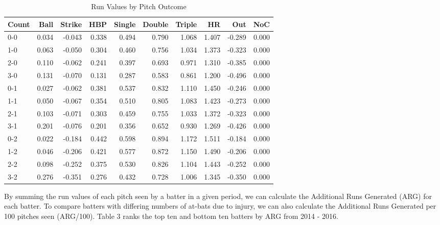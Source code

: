 \documentclass[11pt]{article}
\begin{document}
\begin{table}[ht]
\centering
\begin{tabular}{lrrrrrrrrr}
  \hline
Count & Ball & Strike & HBP & Single & Double & Triple & HR & Out & NoC \\ 
  \hline
0-0 & 0.034 & -0.043 & 0.338 & 0.494 & 0.790 & 1.068 & 1.407 & -0.289 & 0.000 \\ 
  1-0 & 0.063 & -0.050 & 0.304 & 0.460 & 0.756 & 1.034 & 1.373 & -0.323 & 0.000 \\ 
  2-0 & 0.110 & -0.062 & 0.241 & 0.397 & 0.693 & 0.971 & 1.310 & -0.385 & 0.000 \\ 
  3-0 & 0.131 & -0.070 & 0.131 & 0.287 & 0.583 & 0.861 & 1.200 & -0.496 & 0.000 \\ 
  0-1 & 0.027 & -0.062 & 0.381 & 0.537 & 0.832 & 1.110 & 1.450 & -0.246 & 0.000 \\ 
  1-1 & 0.050 & -0.067 & 0.354 & 0.510 & 0.805 & 1.083 & 1.423 & -0.273 & 0.000 \\ 
  2-1 & 0.103 & -0.071 & 0.303 & 0.459 & 0.755 & 1.033 & 1.372 & -0.323 & 0.000 \\ 
  3-1 & 0.201 & -0.076 & 0.201 & 0.356 & 0.652 & 0.930 & 1.269 & -0.426 & 0.000 \\ 
  0-2 & 0.022 & -0.184 & 0.442 & 0.598 & 0.894 & 1.172 & 1.511 & -0.184 & 0.000 \\ 
  1-2 & 0.046 & -0.206 & 0.421 & 0.577 & 0.872 & 1.150 & 1.490 & -0.206 & 0.000 \\ 
  2-2 & 0.098 & -0.252 & 0.375 & 0.530 & 0.826 & 1.104 & 1.443 & -0.252 & 0.000 \\ 
  3-2 & 0.276 & -0.351 & 0.276 & 0.432 & 0.728 & 1.006 & 1.345 & -0.350 & 0.000 \\ 
   \hline
\end{tabular}
\caption{Run Values by Pitch Outcome}
\end{table}

By summing the run values of each pitch seen by a batter in a given period, we can calculate the Additional Runs Generated (ARG) for each batter.  To compare batters with differing numbers of at-bats due to injury, we can also calculate the Additional Runs Generated per 100 pitches seen (ARG/100).  Table 3 ranks the top ten and bottom ten batters by ARG from 2014 - 2016.\\
\end{document}
